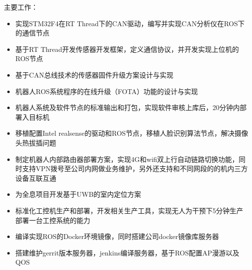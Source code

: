 \documentclass[10pt,a4paper,mono]{moderncv}   %
\begin{document}
\begin{CJK*}{UTF8}{gbsn}
{  \newline{}
  主要工作：
  \begin{itemize}
  \item 实现STM32F4在RT Thread下的CAN驱动，编写并实现CAN分析仪在ROS下的通信节点
  \item 基于RT Thread开发传感器开发框架，定义通信协议，并开发实现上位机的ROS节点
  \item 基于CAN总线技术的传感器固件升级方案设计与实现
  \item 机器人ROS系统程序的在线升级（FOTA）功能的设计与实现
  \item 机器人系统及软件节点的标准输出和打包，实现软件审核上库后，20分钟内部署入目标机
  \item 移植配置Intel realsense的驱动和ROS节点，移植人脸识别算法节点，解决摄像头热拔插问题
  \item 制定机器人内部路由器部署方案，实现4G和wifi双上行自动链路切换功能，同时支持VPN拨号至公司内网做业务维护，另外还支持和不同网段的的机内三方设备互联互通
  \item 为全息项目开发基于UWB的室内定位方案
  \item 标准化工控机生产和部署，开发相关生产工具，实现无人为干预下5分钟生产部署一台工控系统的能力
  \item 编译实现ROS的Docker环境镜像，同时搭建公司docker镜像库服务器
  \item 搭建维护gerrit版本服务器，jenkins编译服务器，基于ROS配置AP漫游以及QOS
  \end{itemize}
}
\end{CJK*}
\end{document}

